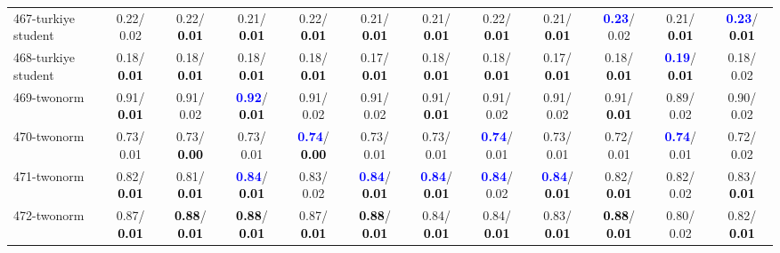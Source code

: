 \begin{table}[h]
\begin{center}
{\begin{tabular}{lc|c|c|c|c|c|c|c|c|c|c}
467-turkiye student &   0.22/  0.02 &   0.22/\textcolor{black}{\textbf{  0.01}} &   0.21/\textcolor{black}{\textbf{  0.01}} &   0.22/\textcolor{black}{\textbf{  0.01}} &   0.21/\textcolor{black}{\textbf{  0.01}} &   0.21/\textcolor{black}{\textbf{  0.01}} &   0.22/\textcolor{black}{\textbf{  0.01}} &   0.21/\textcolor{black}{\textbf{  0.01}} & \textcolor{blue}{\textbf{  0.23}}/  0.02 &   0.21/\textcolor{black}{\textbf{  0.01}} & \textcolor{blue}{\textbf{  0.23}}/\textcolor{black}{\textbf{  0.01}} \\
468-turkiye student &   0.18/\textcolor{black}{\textbf{  0.01}} &   0.18/\textcolor{black}{\textbf{  0.01}} &   0.18/\textcolor{black}{\textbf{  0.01}} &   0.18/\textcolor{black}{\textbf{  0.01}} &   0.17/\textcolor{black}{\textbf{  0.01}} &   0.18/\textcolor{black}{\textbf{  0.01}} &   0.18/\textcolor{black}{\textbf{  0.01}} &   0.17/\textcolor{black}{\textbf{  0.01}} &   0.18/\textcolor{black}{\textbf{  0.01}} & \textcolor{blue}{\textbf{  0.19}}/\textcolor{black}{\textbf{  0.01}} &   0.18/  0.02 \\
469-twonorm &   0.91/\textcolor{black}{\textbf{  0.01}} &   0.91/  0.02 & \textcolor{blue}{\textbf{  0.92}}/\textcolor{black}{\textbf{  0.01}} &   0.91/  0.02 &   0.91/  0.02 &   0.91/\textcolor{black}{\textbf{  0.01}} &   0.91/  0.02 &   0.91/  0.02 &   0.91/\textcolor{black}{\textbf{  0.01}} &   0.89/  0.02 &   0.90/  0.02 \\ \hline
470-twonorm &   0.73/  0.01 &   0.73/\textcolor{black}{\textbf{  0.00}} &   0.73/  0.01 & \textcolor{blue}{\textbf{  0.74}}/\textcolor{black}{\textbf{  0.00}} &   0.73/  0.01 &   0.73/  0.01 & \textcolor{blue}{\textbf{  0.74}}/  0.01 &   0.73/  0.01 &   0.72/  0.01 & \textcolor{blue}{\textbf{  0.74}}/  0.01 &   0.72/  0.02 \\
471-twonorm &   0.82/\textcolor{black}{\textbf{  0.01}} &   0.81/\textcolor{black}{\textbf{  0.01}} & \textcolor{blue}{\textbf{  0.84}}/\textcolor{black}{\textbf{  0.01}} &   0.83/  0.02 & \textcolor{blue}{\textbf{  0.84}}/\textcolor{black}{\textbf{  0.01}} & \textcolor{blue}{\textbf{  0.84}}/\textcolor{black}{\textbf{  0.01}} & \textcolor{blue}{\textbf{  0.84}}/  0.02 & \textcolor{blue}{\textbf{  0.84}}/\textcolor{black}{\textbf{  0.01}} &   0.82/\textcolor{black}{\textbf{  0.01}} &   0.82/  0.02 &   0.83/\textcolor{black}{\textbf{  0.01}} \\
472-twonorm &   0.87/\textcolor{black}{\textbf{  0.01}} & \textcolor{black}{\textbf{  0.88}}/\textcolor{black}{\textbf{  0.01}} & \textcolor{black}{\textbf{  0.88}}/\textcolor{black}{\textbf{  0.01}} &   0.87/\textcolor{black}{\textbf{  0.01}} & \textcolor{black}{\textbf{  0.88}}/\textcolor{black}{\textbf{  0.01}} &   0.84/\textcolor{black}{\textbf{  0.01}} &   0.84/\textcolor{black}{\textbf{  0.01}} &   0.83/\textcolor{black}{\textbf{  0.01}} & \textcolor{black}{\textbf{  0.88}}/\textcolor{black}{\textbf{  0.01}} &   0.80/  0.02 &   0.82/\textcolor{black}{\textbf{  0.01}} \\

\end{tabular}}
\end{center}
\end{table}
